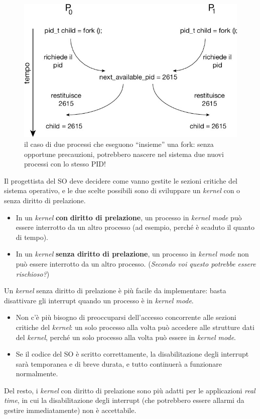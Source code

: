 \begin{figure}[h]
    \centering
    \includegraphics[width=0.5\linewidth]{images/kernel_sezioneCritica.png}
    \caption{il caso di due processi che eseguono “insieme” una fork: senza opportune precauzioni, potrebbero nascere nel sistema due nuovi processi con lo stesso PID!}
    \label{fig:kernel-criticSection}
\end{figure}
Il progettista del SO deve decidere come vanno gestite le sezioni critiche del sistema operativo, e le due scelte possibili sono di sviluppare un \textit{kernel} con o senza diritto di prelazione.
\begin{itemize}
    \item In un \textit{kernel} \textbf{con} \textbf{diritto di prelazione}, un processo in \textit{kernel mode} può essere interrotto da un altro processo (ad esempio, perché è scaduto il quanto di tempo).
    \item In un \textit{kernel} \textbf{senza diritto di prelazione}, un processo in \textit{kernel mode} non può essere interrotto da un altro processo. (\textit{Secondo voi questo potrebbe essere rischioso?})
\end{itemize}
Un \textit{kernel} senza diritto di prelazione è più facile da implementare: basta disattivare gli interrupt quando un processo è in \textit{kernel mode}.
\begin{itemize}
    \item Non c'è più bisogno di preoccuparsi dell'accesso concorrente alle sezioni critiche del \textit{kernel}: un solo processo alla volta può accedere alle strutture dati del \textit{kernel}, perché un solo processo alla volta può essere in \textit{kernel mode}.
    \item Se il codice del SO è scritto correttamente, la disabilitazione degli interrupt sarà temporanea e di breve durata, e tutto continuerà a funzionare normalmente.
\end{itemize}
Del resto, i \textit{kernel} con diritto di prelazione sono più adatti per le applicazioni \textit{real time}, in cui la disabilitazione degli interrupt (che potrebbero essere allarmi da gestire immediatamente) non è accettabile.
